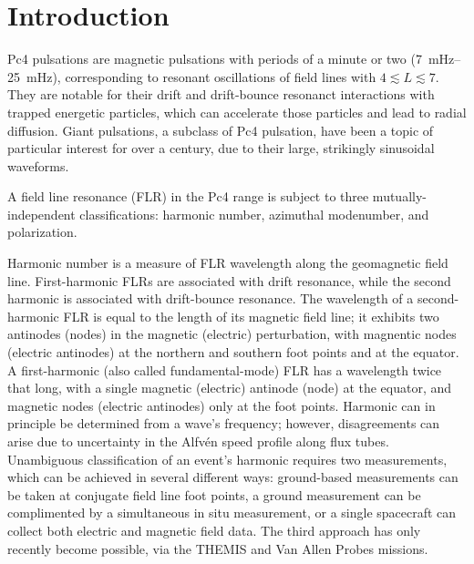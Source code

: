 \documentclass{article}
\newcommand{\Alfven}{Alfv\'en\xspace}
\begin{document}

\section{Introduction}

Pc4 pulsations are magnetic pulsations with periods of a minute or two (\SIrange{7}{25}{\mHz}), corresponding to resonant oscillations of field lines with $4 \lesssim L \lesssim 7$. They are notable for their drift and drift-bounce resonanct interactions with trapped energetic particles\cite{southwood_1976}, which can accelerate those particles\cite{elkington_1999} and lead to radial diffusion\cite{elkington_2003}. Giant pulsations, a subclass of Pc4 pulsation, have been a topic of particular interest for over a century, due to their large, strikingly sinusoidal waveforms\cite{brekke_1987}.

A field line resonance (FLR) in the Pc4 range is subject to three mutually-independent classifications: harmonic number, azimuthal modenumber, and polarization.

Harmonic number is a measure of FLR wavelength along the geomagnetic field line. First-harmonic FLRs are associated with drift resonance, while the second harmonic is associated with drift-bounce resonance\cite{dai_2013,poulter_1983}. The wavelength of a second-harmonic FLR is equal to the length of its magnetic field line; it exhibits two antinodes (nodes) in the magnetic (electric) perturbation, with magnentic nodes (electric antinodes) at the northern and southern foot points and at the equator. A first-harmonic (also called fundamental-mode) FLR has a wavelength twice that long, with a single magnetic (electric) antinode (node) at the equator, and magnetic nodes (electric antinodes) only at the foot points. Harmonic can in principle be determined from a wave's frequency; however, disagreements can arise due to uncertainty in the \Alfven speed profile along flux tubes\cite{takahashi_2013}. Unambiguous classification of an event's harmonic requires two measurements, which can be achieved in several different ways: ground-based measurements can be taken at conjugate field line foot points, a ground measurement can be complimented by a simultaneous in situ measurement, or a single spacecraft can collect both electric and magnetic field data\cite{dai_2015}. The third approach has only recently become possible, via the THEMIS\cite{angelopoulos_2008} and Van Allen Probes\cite{stratton_2012} missions.
\end{document}
